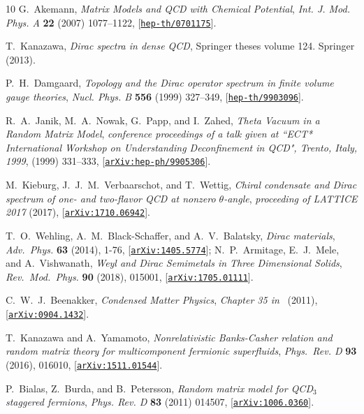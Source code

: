 \documentclass[aps,prl,reprint,graphicx,showpacs]{revtex4-1}
\begin{document}
\begin{thebibliography}{10}
G.~Akemann, {\it Matrix Models and QCD with Chemical Potential}, {\em Int. J. Mod. Phys. A} {\bf 22} (2007) 1077--1122, 
[\href{http://arxiv.org/abs/hep-th/0701175}{\tt hep-th/0701175}].

T.~Kanazawa, {\it Dirac spectra in dense QCD}, Springer theses volume 124. Springer (2013). 

P.~H.~Damgaard, {\it Topology and the Dirac operator spectrum in finite volume gauge theories}, 
{\em Nucl. Phys. B} {\bf 556} (1999) 327--349, 
[\href{https://arxiv.org/abs/hep-th/9903096}{\tt hep-th/9903096}].

R.~A.~Janik, M.~A.~Nowak, G.~Papp, and I.~Zahed, {\it {Theta  Vacuum in a Random Matrix Model}},  \textit{conference proceedings of a talk given at ``ECT* International Workshop on Understanding Deconfinement in QCD", Trento, Italy, 1999}, (1999) 331--333,
  [\href{https://arxiv.org/abs/hep-ph/9905306}{{\tt arXiv:hep-ph/9905306}}].

M.~Kieburg, J.~J.~M.~Verbaarschot, and T.~Wettig, {\it {Chiral condensate and Dirac spectrum of one- and two-flavor QCD at nonzero $\theta$-angle}}, {\em proceeding of LATTICE 2017} (2017),
  [\href{https://arxiv.org/abs/1710.06942}{{\tt arXiv:1710.06942}}].

{ 
T.~O.~Wehling, A.~M.~Black-Schaffer, and A.~V.~Balatsky, {\it Dirac materials}, {\em Adv.~Phys.} {\bf 63} (2014), 1-76,
[\href{https://arxiv.org/abs/1405.5774}{\tt arXiv:1405.5774}];
N.~P.~Armitage, E.~J.~Mele, and A.~Vishwanath, {\it Weyl and Dirac Semimetals in Three Dimensional Solids}, {\em Rev.~Mod.~Phys.} {\bf 90} (2018), 015001,
[\href{https://arxiv.org/abs/1705.01111}{\tt arXiv:1705.01111}].

C.~W.~J.~Beenakker,  {\it {Condensed Matter Physics}},  {\em Chapter 35 in}~\cite{handbook:2010} (2011),
  [\href{https://arxiv.org/abs/0904.1432}{{\tt arXiv:0904.1432}}].

T.~Kanazawa and A.~Yamamoto, {\it Nonrelativistic Banks-Casher relation and random matrix theory for multicomponent fermionic superfluids}, {\em Phys.~Rev. D} {\bf 93} (2016), 016010,
[\href{https://arxiv.org/abs/1511.01544}{\tt arXiv:1511.01544}].
}

P.~Bialas, Z.~Burda, and B.~Petersson, {\it {Random matrix model for QCD$_3$
  staggered fermions}},  {\em Phys. Rev. D} {\bf 83} (2011) 014507,
  [\href{http://arxiv.org/abs/1006.0360}{{\tt arXiv:1006.0360}}].


\end{thebibliography}
\end{document}
